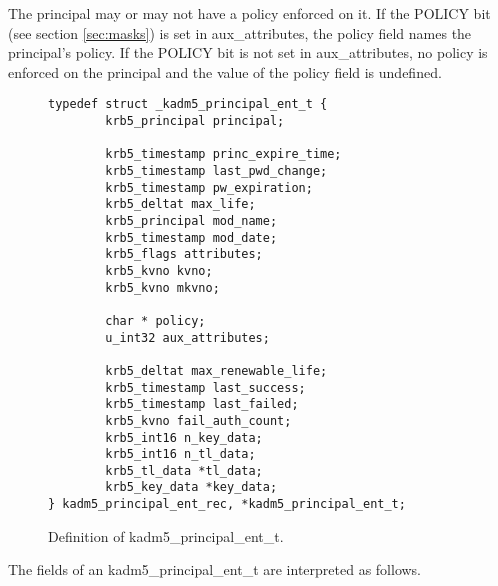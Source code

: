 The principal may or may not have a policy enforced on it.  If the
POLICY bit (see section \ref{sec:masks}) is set in aux_attributes, the
policy field names the principal's policy.  If the POLICY bit is not
set in aux_attributes, no policy is enforced on the principal and the
value of the policy field is undefined.

\begin{figure}[htbp]
\begin{verbatim}
typedef struct _kadm5_principal_ent_t {
        krb5_principal principal;

        krb5_timestamp princ_expire_time;
        krb5_timestamp last_pwd_change;
        krb5_timestamp pw_expiration;
        krb5_deltat max_life;
        krb5_principal mod_name;
        krb5_timestamp mod_date;
        krb5_flags attributes;
        krb5_kvno kvno;
        krb5_kvno mkvno;

        char * policy;
        u_int32 aux_attributes;

        krb5_deltat max_renewable_life;
        krb5_timestamp last_success;
        krb5_timestamp last_failed;
        krb5_kvno fail_auth_count;
        krb5_int16 n_key_data;
        krb5_int16 n_tl_data;
        krb5_tl_data *tl_data;
        krb5_key_data *key_data;
} kadm5_principal_ent_rec, *kadm5_principal_ent_t;
\end{verbatim}
\caption{Definition of kadm5_principal_ent_t.}
\label{fig:princ-t}
\end{figure}

The fields of an kadm5_principal_ent_t are interpreted as
follows.

